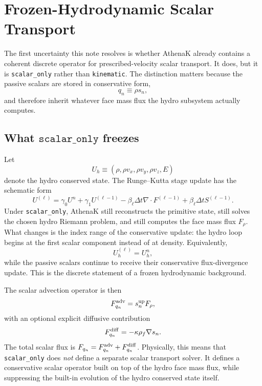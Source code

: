 \documentclass[twocolumn]{aastex7}
\newcommand{\code}[1]{\texttt{#1}}
\newcommand{\SO}{\code{scalar\_only}\xspace}
\newcommand{\kin}{\code{kinematic}\xspace}
\begin{document}
\section{Frozen-Hydrodynamic Scalar Transport}
\label{sec:transport}
The first uncertainty this note resolves is whether AthenaK already contains a coherent discrete operator for prescribed-velocity scalar transport. It does, but it is \SO rather than \kin. The distinction matters because the passive scalars are stored in conservative form,
\begin{equation}
q_n \equiv \rho s_n,
\end{equation}
and therefore inherit whatever face mass flux the hydro subsystem actually computes.

\subsection{What \texorpdfstring{$\SO$}{scalar\_only} freezes}
Let
\begin{equation}
U_h \equiv \left(\rho,\rho v_x,\rho v_y,\rho v_z,E\right)
\end{equation}
denote the hydro conserved state. The Runge--Kutta stage update has the schematic form
\begin{equation}
U^{(\ell)} = \gamma_0 U^n + \gamma_1 U^{(\ell-1)}
  - \beta_\ell \Delta t \nabla\cdot F^{(\ell-1)}
  + \beta_\ell \Delta t S^{(\ell-1)}.
\end{equation}
Under \SO, AthenaK still reconstructs the primitive state, still solves the chosen hydro Riemann problem, and still computes the face mass flux $F_\rho$. What changes is the index range of the conservative update: the hydro loop begins at the first scalar component instead of at density. Equivalently,
\begin{equation}
U_h^{(\ell)} = U_h^n,
\end{equation}
while the passive scalars continue to receive their conservative flux-divergence update. This is the discrete statement of a frozen hydrodynamic background.

The scalar advection operator is then
\begin{equation}
F_{q_n}^{\rm adv} = s_n^{\rm up} F_\rho,
\end{equation}
with an optional explicit diffusive contribution
\begin{equation}
F_{q_n}^{\rm diff} = -\kappa \rho_f \nabla s_n.
\end{equation}
The total scalar flux is $F_{q_n}=F_{q_n}^{\rm adv}+F_{q_n}^{\rm diff}$. Physically, this means that \SO does \emph{not} define a separate scalar transport solver. It defines a conservative scalar operator built on top of the hydro face mass flux, while suppressing the built-in evolution of the hydro conserved state itself.
\end{document}
